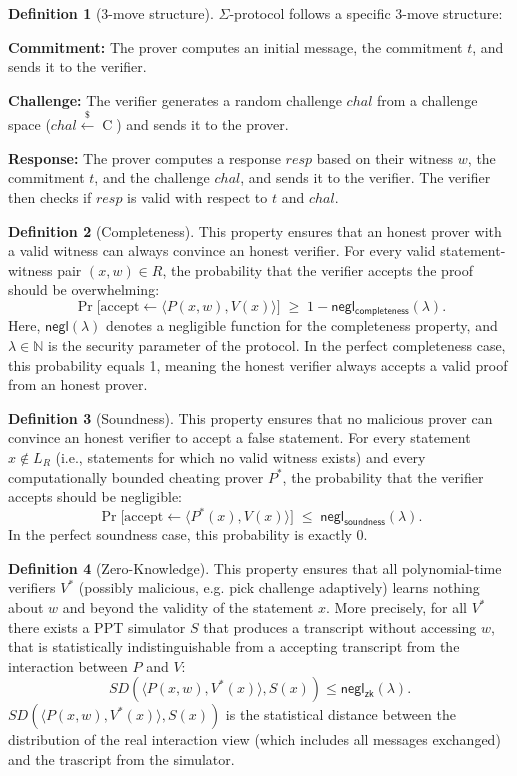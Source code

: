 \documentclass[12pt]{article}
\theoremstyle{definition}
\newtheorem{definition}{Definition}[section]
\begin{document}
\begin{definition}[3-move structure]
  \(\Sigma\)-protocol follows a specific 3-move structure:
    \item \textbf{Commitment:} The prover computes an initial message, the commitment \(t\), and sends it to the verifier.
    \item \textbf{Challenge:} The verifier generates a random challenge \(chal\) from a challenge space ($chal \xleftarrow{\$} \mathbin{C}$) and sends it to the prover.
    \item \textbf{Response:} The prover computes a response \(resp\) based on their witness $w$, the commitment $t$, and the challenge $chal$, and sends it to the verifier. The verifier then checks if \(resp\) is valid with respect to $t$ and $chal$.
\end{definition}

\begin{definition}[Completeness] This property ensures that an honest prover with a valid witness can always convince an honest verifier. For every valid statement-witness pair \((x,w)\in R\), the probability that the verifier accepts the proof should be overwhelming:
  \[
    \Pr\bigl[\text{accept} \leftarrow \langle P(x,w), V(x)\rangle\bigr]
    \;\ge\; 1 - \mathsf{negl_{completeness}}(\lambda).
  \]
  Here, $\mathsf{negl}(\lambda)$ denotes a negligible function for the completeness property, and $\lambda \in \mathbb{N}$ is the security parameter of the protocol. In the perfect completeness case, this probability equals 1, meaning the honest verifier always accepts a valid proof from an honest prover.
\end{definition}

\begin{definition}[Soundness] This property ensures that no malicious prover can convince an honest verifier to accept a false statement. For every statement \(x\notin L_R\) (i.e., statements for which no valid witness exists) and every computationally bounded cheating prover \(P^*\), the probability that the verifier accepts should be negligible:
  \[
    \Pr\bigl[\text{accept} \leftarrow \langle P^*(x), V(x)\rangle\bigr]
    \;\le\; \mathsf{negl_{soundness}}(\lambda).
  \]
 In the perfect soundness case, this probability is exactly 0.
\end{definition}
\begin{definition}[Zero-Knowledge] This property ensures that all polynomial-time verifiers $V^*$ (possibly malicious, e.g. pick challenge adaptively) learns nothing about $w$ and beyond the validity of the statement $x$. More precisely, for all $V^*$ there exists a PPT simulator $S$ that produces a transcript without accessing $w$, that is statistically indistinguishable from a accepting transcript from the interaction between $P$ and $V$:
  \[
  SD(\langle P(x,w),V^*(x)\rangle , S(x))\leq \mathsf{negl_{zk}}(\lambda).
  \]
  $SD(\langle P(x,w),V^*(x)\rangle , S(x))$ is the statistical distance between the distribution of the real interaction view (which includes all messages exchanged) and the trascript from the simulator.
\end{definition}
\end{document}
